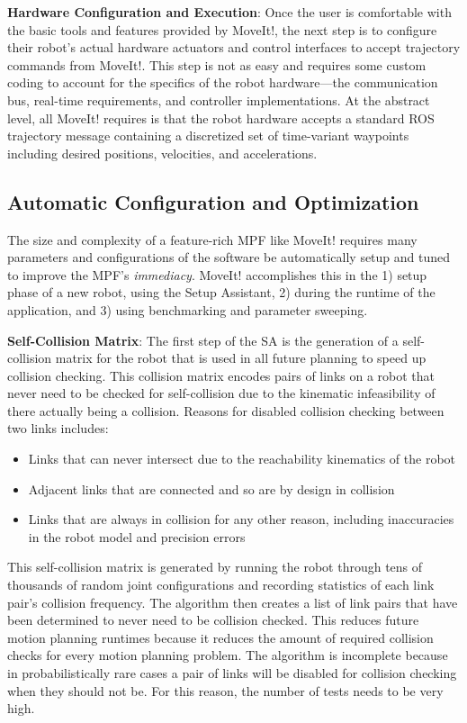 \documentclass[10pt,journal,compsoc]{joser1}
\begin{document}
{{\bf Hardware Configuration and Execution}: Once the user is comfortable with
the basic tools and features provided by MoveIt!, the next step is to configure
their robot's actual hardware actuators and control interfaces to accept
trajectory commands from MoveIt!. This step is not as easy and requires some
custom coding to account for the specifics of the robot hardware---the
communication bus, real-time requirements, and controller implementations. At
the abstract level, all MoveIt! requires is that the robot hardware accepts a
standard ROS trajectory message containing a discretized set of time-variant
waypoints including desired positions, velocities, and accelerations.  

\subsection{Automatic Configuration and Optimization}

The size and complexity of a feature-rich MPF like MoveIt! requires many
parameters and configurations of the software be automatically setup and tuned
to improve the MPF's \textit{immediacy}. MoveIt! accomplishes this in the 1)
setup phase of a new robot, using the Setup Assistant, 2) during the runtime of
the application, and 3) using benchmarking and parameter
sweeping\cite{cohen2012generic}.

{\bf Self-Collision Matrix}: The first step of the SA is the generation of a
self-collision matrix for the robot that is used in all future planning to speed
up collision checking. This collision matrix encodes pairs of links on a robot
that never need to be checked for self-collision due to the kinematic
infeasibility of there actually being a collision. Reasons for disabled
collision checking between two links includes:
\begin{itemize}
    \item Links that can never intersect due to the reachability kinematics of
the robot
    \item Adjacent links that are connected and so are by design in collision
    \item Links that are always in collision for any other reason, including
inaccuracies in the robot model and precision errors
\end{itemize}

This self-collision matrix is generated by running the robot through tens of
thousands of random joint configurations and recording statistics of each link
pair's collision frequency. The algorithm then creates a list of link pairs that
have been determined to never need to be collision checked. This reduces future
motion planning runtimes because it reduces the amount of required collision
checks for every motion planning problem. The algorithm is incomplete because in
probabilistically rare cases a pair of links will be disabled for collision
checking when they should not be. For this reason, the number of tests needs to
be very high.

}
\end{document}
